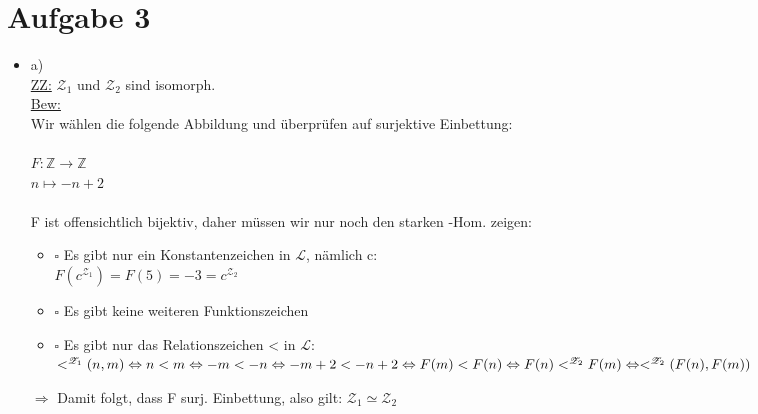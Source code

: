 \documentclass[a4paper]{scrartcl}
\begin{document}
\section*{Aufgabe 3}%
\label{sec:aufgabe_3}

    \begin{itemize}
        \item a)\\
            \underline{ZZ:} $\mathscr{Z}_1$ und $\mathscr{Z}_2$ sind isomorph.\\
            \underline{Bew:}\\
            Wir wählen die folgende Abbildung und überprüfen auf surjektive Einbettung:\\
            \\$F: \mathds{Z} \rightarrow \mathds{Z}$\\
            $n \mapsto -n + 2$\\

            \\F ist offensichtlich bijektiv, daher müssen wir nur noch den starken -Hom. zeigen:\\

            \begin{itemize}
                \item $\square$ Es gibt nur ein Konstantenzeichen in $\mathscr{L}$, nämlich c:\\
                    $F(c^{\mathscr{Z}_1}) = F(5) = -3 = c^{\mathscr{Z}_2}$
                \item $\square$ Es gibt keine weiteren Funktionszeichen
                \item $\square$ Es gibt nur das Relationszeichen < in $\mathscr{L}$:\\
                    $<^{\mathscr{Z}_1}(n,m)\\ \Leftrightarrow n < m\\ \Leftrightarrow -m < -n\\ \Leftrightarrow -m + 2 < -n + 2\\ \Leftrightarrow F(m) < F(n)\\
                    \Leftrightarrow F(n) <^{\mathscr{Z}_2} F(m)\\ \Leftrightarrow <^{\mathscr{Z}_2}(F(n), F(m))$

            \end{itemize} 
            
            $\Rightarrow$ Damit folgt, dass F surj. Einbettung, also gilt: $\mathscr{Z}_1 \simeq \mathscr{Z}_2$


\end{itemize}
\end{document}
